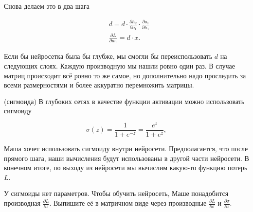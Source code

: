 \begin{sol}
Снова делаем это в два шага

\begin{equation*} 
	\begin{aligned}
		&  d = d \cdot  \frac{\partial h_2}{\partial o_1} \cdot \frac{\partial o_1}{\partial h_1} \\
		&  \frac{\partial L}{\partial w_1} = d \cdot x.
	\end{aligned}
\end{equation*}

Если бы нейросетка была бы глубже, мы смогли бы переиспользовать $d$ на следующих слоях. Каждую производную мы нашли ровно один раз.  В случае матриц происходит всё ровно то же самое, но дополнительно надо проследить за всеми размерностями и более аккуратно перемножить матрицы.
\end{sol} 



\begin{problem}{(сигмоида)}
В глубоких сетях в качестве функции активации можно использовать сигмоиду

\[
\sigma(z) = \frac{1}{1 + e^{-z}} = \frac{e^z}{1 + e^{z}},
\]

Маша хочет использовать сигмоиду внутри нейросети. Предполагается, что после прямого шага, наши вычисления будут использованы в другой части нейросети. В конечном итоге, по выходу из нейросети мы вычислим какую-то функцию потерь $L$. 

У сигмоиды нет параметров. Чтобы обучить нейросеть, Маше понадобится производная $\frac{\partial L}{\partial z}$. Выпишите её в матричном виде через производные $\frac{\partial L}{\partial \sigma}$ и $\frac{\partial \sigma}{\partial z}$.
\end{problem}

